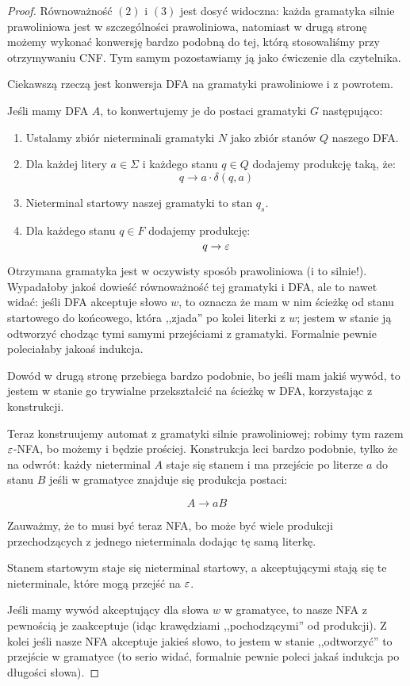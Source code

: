 \begin{proof}
    Równoważność \((2)\) i \((3)\) jest dosyć widoczna: każda gramatyka silnie prawoliniowa jest w szczególności prawoliniowa, natomiast w drugą stronę możemy wykonać konwersję bardzo podobną do tej, którą stosowaliśmy przy otrzymywaniu CNF. Tym samym pozostawiamy ją jako ćwiczenie dla czytelnika. 
    
    Ciekawszą rzeczą jest konwersja DFA na gramatyki prawoliniowe i z powrotem. 
    
    Jeśli mamy DFA \(A\), to konwertujemy je do postaci gramatyki \(G\) następująco: 
    
    \begin{enumerate}
        \item Ustalamy zbiór nieterminali gramatyki \(N\) jako zbiór stanów \(Q\) naszego DFA.
        \item Dla każdej litery \(a \in \Sigma\) i każdego stanu \(q\in Q\) dodajemy produkcję taką, że: 
            \[ 
                q \rightarrow a \cdot \delta(q,a)
            \]
        \item Nieterminal startowy naszej gramatyki to stan \(q_s\). 
        \item Dla każdego stanu \(q \in F\) dodajemy produkcję: 
        \[ 
            q \rightarrow \varepsilon 
        \]
    \end{enumerate}
    
    Otrzymana gramatyka jest w oczywisty sposób prawoliniowa (i to silnie!). Wypadałoby jakoś dowieść równoważność tej gramatyki i DFA, ale to nawet widać: jeśli DFA akceptuje słowo \(w\), to oznacza że mam w nim ścieżkę od stanu startowego do końcowego, która ,,zjada'' po kolei literki z \(w\); jestem w stanie ją odtworzyć chodząc tymi samymi przejściami z gramatyki. Formalnie pewnie poleciałaby jakoaś indukcja. 
    
    Dowód w drugą stronę przebiega bardzo podobnie, bo jeśli mam jakiś wywód, to jestem w stanie go trywialne przekształcić na ścieżkę w DFA, korzystając z konstrukcji.
    
    Teraz konstruujemy automat z gramatyki silnie prawoliniowej; robimy tym razem \(\varepsilon\)-NFA, bo możemy i będzie prościej. Konstrukcja leci bardzo podobnie, tylko że na odwrót: każdy nieterminal \(A\) staje się stanem i ma przejście po literze \(a\) do stanu \(B\) jeśli w gramatyce znajduje się produkcja postaci: 
    
    \[ 
        A \rightarrow aB
    \]
    
    Zauważmy, że to musi być teraz NFA, bo może być wiele produkcji przechodzących z jednego nieterminala dodając tę samą literkę. 
    
    Stanem startowym staje się nieterminal startowy, a akceptującymi stają się te nieterminale, które mogą przejść na \(\varepsilon\). 
    
    Jeśli mamy wywód akceptujący dla słowa \(w\) w gramatyce, to nasze NFA z pewnością je zaakceptuje (idąc krawędziami ,,pochodzącymi'' od produkcji). Z kolei jeśli nasze NFA akceptuje jakieś słowo, to jestem w stanie ,,odtworzyć'' to przejście w gramatyce (to serio widać, formalnie pewnie poleci jakaś indukcja po długości słowa). 
    
\end{proof}